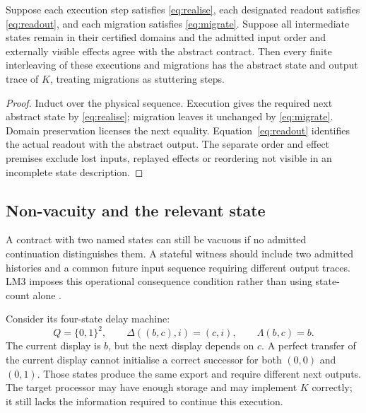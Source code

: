 \begin{theorem}
\label{thm:continuation}
Suppose each execution step satisfies \eqref{eq:realise}, each designated readout satisfies \eqref{eq:readout}, and each migration satisfies \eqref{eq:migrate}. Suppose all intermediate states remain in their certified domains and the admitted input order and externally visible effects agree with the abstract contract. Then every finite interleaving of these executions and migrations has the abstract state and output trace of \(K\), treating migrations as stuttering steps.
\end{theorem}
\begin{proof}
Induct over the physical sequence. Execution gives the required next abstract state by \eqref{eq:realise}; migration leaves it unchanged by \eqref{eq:migrate}. Domain preservation licenses the next equality. Equation~\eqref{eq:readout} identifies the actual readout with the abstract output. The separate order and effect premises exclude lost inputs, replayed effects or reordering not visible in an incomplete state description.
\end{proof}

\subsection{Non-vacuity and the relevant state}

A contract with two named states can still be vacuous if no admitted continuation distinguishes them. A stateful witness should include two admitted histories and a common future input sequence requiring different output traces. LM3 imposes this operational consequence condition rather than using state-count alone \cite[\S6.7]{LM3}.

Consider its four-state delay machine:
\begin{equation}
Q=\{0,1\}^2,\qquad
\Delta((b,c),i)=(c,i),\qquad \Lambda(b,c)=b.
\label{eq:delay}
\end{equation}
The current display is \(b\), but the next display depends on \(c\). A perfect transfer of the current display cannot initialise a correct successor for both \((0,0)\) and \((0,1)\). Those states produce the same export and require different next outputs. The target processor may have enough storage and may implement \(K\) correctly; it still lacks the information required to continue this execution.


